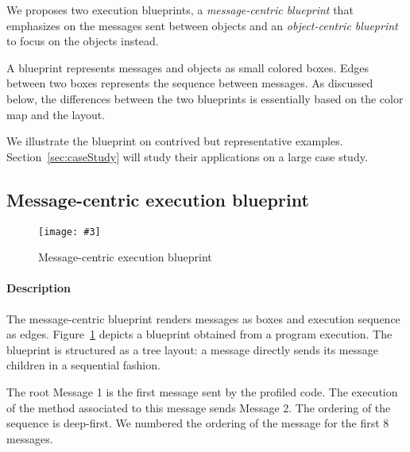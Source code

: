 \documentclass{sig-alternate}
\newcommand{\fig}[4]{
	\begin{figure}[#1]
		\centering
		\texttt{[image: \#3]}
		\caption{\label{fig:#3}#4}
	\end{figure}}
\newcommand{\figref}[1]{Figure~\ref{fig:#1}}
\newcommand{\secref}[1]{Section~\ref{sec:#1}}
\begin{document}
We proposes two execution blueprints, a \emph{message-centric blueprint} that emphasizes on the messages sent between objects and an \emph{object-centric blueprint} to focus on the objects instead.

A blueprint represents messages and objects as small colored boxes. Edges between two boxes represents the sequence between messages. As discussed below, the differences between the two blueprints is essentially based on the color map and the layout.

We illustrate the blueprint on contrived but representative examples. \secref{caseStudy} will study their applications on a large case study.

%
%
%


\subsection{Message-centric execution blueprint}

\fig{}{0.48}{MessageCentricBlueprint}{Message-centric execution blueprint}

\paragraph{Description}

The message-centric blueprint renders messages as boxes and execution sequence as edges. \figref{MessageCentricBlueprint} depicts a blueprint obtained from a program execution. The blueprint is structured as a tree layout: a message directly sends its message children in a sequential fashion. 

The root Message 1 is the first message sent by the profiled code. The execution of the method associated to this message sends Message 2. The ordering of the sequence is deep-first. We numbered the ordering of the message for the first 8 messages. 
\end{document}
